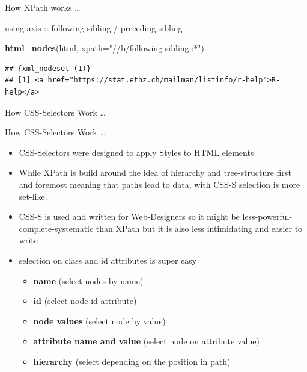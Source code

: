 \documentclass[ignorenonframetext,]{beamer}
\newenvironment{Shaded}{\begin{snugshade}}{\end{snugshade}}
\newcommand{\KeywordTok}[1]{\textcolor[rgb]{0.13,0.29,0.53}{\textbf{{#1}}}}
\newcommand{\DataTypeTok}[1]{\textcolor[rgb]{0.13,0.29,0.53}{{#1}}}
\newcommand{\StringTok}[1]{\textcolor[rgb]{0.31,0.60,0.02}{{#1}}}
\newcommand{\NormalTok}[1]{{#1}}
\providecommand{\tightlist}{%
  \setlength{\itemsep}{0pt}\setlength{\parskip}{0pt}}
\begin{document}
\begin{frame}[fragile]{How XPath works \ldots{}}
\begin{block}{using axis :: following-sibling / preceding-sibling}
\begin{Shaded}
\begin{Highlighting}[]
\KeywordTok{html_nodes}\NormalTok{(html, }\DataTypeTok{xpath=}\StringTok{"//b/following-sibling::*"}\NormalTok{)}
\end{Highlighting}
\end{Shaded}

\begin{verbatim}
## {xml_nodeset (1)}
## [1] <a href="https://stat.ethz.ch/mailman/listinfo/r-help">R-help</a>
\end{verbatim}

\end{block}

\end{frame}

\begin{frame}[fragile]{How CSS-Selectors Work \ldots{}}

\begin{block}{How CSS-Selectors Work \ldots{}}

\begin{itemize}
\tightlist
\item
  CSS-Selectors were designed to apply Styles to HTML elements
\item
  While XPath is build around the idea of hierarchy and tree-structure
  first and foremost meaning that paths lead to data, with CSS-S
  selection is more set-like.
\item
  CSS-S is used and written for Web-Designers so it might be
  less-powerful-complete-systematic than XPath but it is also less
  intimidating and easier to write
\item
  selection on class and id attributes is super easy

  \begin{itemize}
  \tightlist
  \item
    \textbf{name} (select nodes by name)
  \item
    \textbf{id} (select node id attribute)
  \item
    \textbf{node values} (select node by value)
  \item
    \textbf{attribute name and value} (select node on attribute value)
  \item
    \textbf{hierarchy} (select depending on the position in path)
  \end{itemize}
\end{itemize}

\end{block}


\end{frame}
\end{document}
